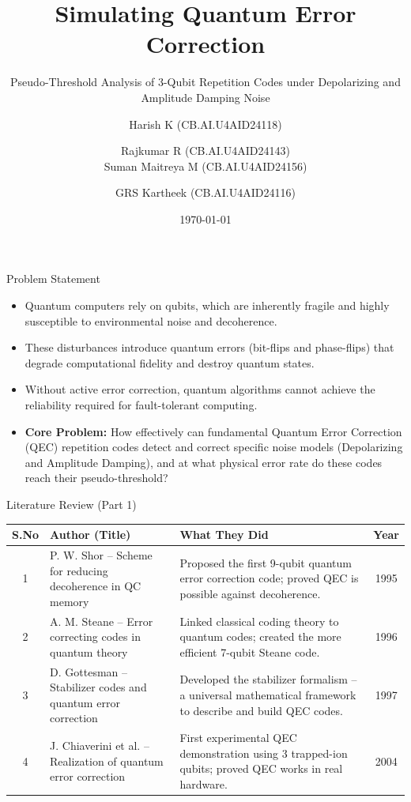 \documentclass[aspectratio=169]{beamer}
\title[Quantum Error Correction]{Simulating Quantum Error Correction}
\subtitle{Pseudo-Threshold Analysis of 3-Qubit Repetition Codes under Depolarizing and Amplitude Damping Noise}
\author[Team 7 - AID B]{Harish K (CB.AI.U4AID24118) \and Rajkumar R (CB.AI.U4AID24143) \\ Suman Maitreya M (CB.AI.U4AID24156) \and GRS Kartheek (CB.AI.U4AID24116)}
\institute[Amrita]{Amrita Vishwa Vidyapeetham}
\date{\today}
\begin{document}
\begin{frame}
\titlepage
\end{frame}
\begin{frame}{Problem Statement}
\begin{itemize}
    \item Quantum computers rely on qubits, which are inherently fragile and highly susceptible to environmental noise and decoherence.
    \item These disturbances introduce quantum errors (bit-flips and phase-flips) that degrade computational fidelity and destroy quantum states.
    \item Without active error correction, quantum algorithms cannot achieve the reliability required for fault-tolerant computing.
    \item \textbf{Core Problem:} How effectively can fundamental Quantum Error Correction (QEC) repetition codes detect and correct specific noise models (Depolarizing and Amplitude Damping), and at what physical error rate do these codes reach their pseudo-threshold?
\end{itemize}
\end{frame}
\begin{frame}{Literature Review (Part 1)}
\scriptsize
\begin{table}
\centering
\begin{tabular}{c p{3.8cm} p{6.5cm} c}
\toprule
\textbf{S.No} & \textbf{Author (Title)} & \textbf{What They Did} & \textbf{Year} \\
\midrule
1 & P. W. Shor -- Scheme for reducing decoherence in QC memory & Proposed the first 9-qubit quantum error correction code; proved QEC is possible against decoherence. & 1995 \\[4pt]
2 & A. M. Steane -- Error correcting codes in quantum theory & Linked classical coding theory to quantum codes; created the more efficient 7-qubit Steane code. & 1996 \\[4pt]
3 & D. Gottesman -- Stabilizer codes and quantum error correction & Developed the stabilizer formalism -- a universal mathematical framework to describe and build QEC codes. & 1997 \\[4pt]
4 & J. Chiaverini et al. -- Realization of quantum error correction & First experimental QEC demonstration using 3 trapped-ion qubits; proved QEC works in real hardware. & 2004 \\
\bottomrule
\end{tabular}
\end{table}
\end{frame}
\end{document}
